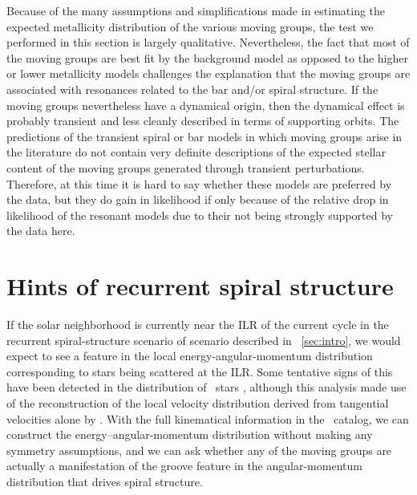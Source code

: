 Because of the many assumptions and simplifications made in estimating
the expected metallicity distribution of the various moving groups,
the test we performed in this section is largely
qualitative. Nevertheless, the fact that most of the moving groups are
best fit by the background model as opposed to the higher or lower
metallicity models challenges the explanation that the moving groups
are associated with resonances related to the bar and/or spiral
structure. If the moving groups nevertheless have a dynamical origin,
then the dynamical effect is probably transient and less cleanly
described in terms of supporting orbits. The predictions of the
transient spiral or bar models in which moving groups arise in the
literature \citep[\eg,][]{deSimone04a,Minchev09a} do not contain very
definite descriptions of the expected stellar content of the moving
groups generated through transient perturbations. Therefore, at this
time it is hard to say whether these models are preferred by the data,
but they do gain in likelihood if only because of the relative drop in
likelihood of the resonant models due to their not being strongly
supported by the data here.

\section{Hints of recurrent spiral structure}\label{sec:sellwood}

If the solar neighborhood is currently near the ILR of the current
cycle in the recurrent spiral-structure scenario of
\citet{Sellwood91a} scenario described in
\sectionname~\ref{sec:intro}, we would expect to see a feature in the
local energy-angular-momentum distribution corresponding to stars
being scattered at the ILR. Some tentative signs of this have been
detected in the distribution of \Hipparcos\ stars \citep{Sellwood00a},
although this analysis made use of the reconstruction of the local
velocity distribution derived from tangential velocities alone by
\citet{1998AJ....115.2384D}. With the full kinematical information in the
\gcsabb\ catalog, we can construct the energy--angular-momentum
distribution without making any symmetry assumptions, and we can ask
whether any of the moving groups are actually a manifestation of the
groove feature in the angular-momentum distribution that drives spiral
structure.

